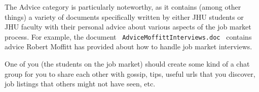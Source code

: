 \documentclass{\classes/econtex}
\begin{document}
\normalsize

The Advice category is particularly noteworthy, as it contains (among
other things) a variety of documents specifically written by either
JHU students or JHU faculty with their personal advice about various
aspects of the job market process.  For example, the document
~\texttt{AdviceMoffittInterviews.doc}~ contains advice Robert Moffitt
has provided about how to handle job market interviews.

\begin{comment} %
  \url{http://www.illinoisskillsmatch.com/} is a site for posting your
  resume and other information for employers to browse.  It may or may
  not be a valuable supplement to the ASSA process.
\end{comment}

One of you (the students on the job market) should create some kind of a chat group for you to share each other with gossip, tips, useful urls that you discover, job listings that others might not have seen, etc.
\end{document}
